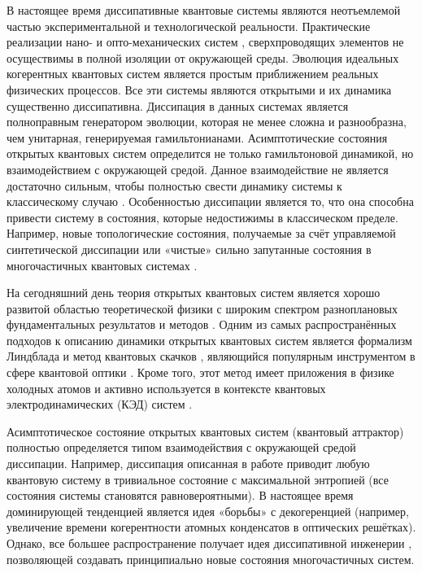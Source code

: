 
{\actuality} 
В настоящее время диссипативные квантовые системы являются неотъемлемой частью экспериментальной и технологической реальности.
Практические реализации нано- \autocite{Poot2012} и опто-механических систем \autocite{Aspelmeyer2014}, сверхпроводящих элементов \autocite{Clarke2008} не осуществимы в полной изоляции от окружающей среды.
Эволюция идеальных когерентных квантовых систем является простым приближением реальных физических процессов. 
Все эти системы являются открытыми и их динамика существенно диссипативна.
Диссипация в данных системах является полноправным генератором эволюции, которая не менее сложна и разнообразна, чем унитарная, генерируемая гамильтонианами.
Асимптотические состояния открытых квантовых систем определится не только гамильтоновой динамикой, но взаимодействием с окружающей средой.
Данное взаимодействие не является достаточно сильным, чтобы полностью свести динамику системы к классическому случаю \autocite{Breuer2007}.
Особенностью диссипации является то, что она способна привести систему в состояния, которые недостижимы в классическом пределе.
Например, новые топологические состояния, получаемые за счёт управляемой синтетической диссипации \autocite{Diehl2011} или «чистые» сильно запутанные состояния в многочастичных квантовых системах \autocite{Kraus2008}.

На сегодняшний день теория открытых квантовых систем является хорошо развитой областью теоретической физики с широким спектром разноплановых фундаментальных результатов и методов \autocite{Breuer2007}.
Одним из самых распространённых подходов к описанию динамики открытых квантовых систем является формализм Линдблада \autocite{Lindblad1976, Gorini1976} и метод квантовых скачков \autocite{Dalibard1992, Dum1992, Plenio1998}, являющийся популярным инструментом в сфере квантовой оптики \autocite{Carmichael1993}.
Кроме того, этот метод имеет приложения в физике холодных атомов \autocite{Diehl2011, Diehl2008, Marcuzzi2014} и активно используется в контексте квантовых электродинамических (КЭД) систем \autocite{Imamoglu1999, Walther2006, Arakawa2015}.

Асимптотическое состояние открытых квантовых систем (квантовый аттрактор) полностью определяется типом взаимодействия с окружающей средой диссипации. 
Например, диссипация описанная в работе \autocite{Poletti2013} приводит любую квантовую систему в тривиальное состояние с максимальной энтропией (все состояния системы становятся равновероятными).
В настоящее время доминирующей тенденцией является идея «борьбы» с декогеренцией (например, увеличение времени когерентности атомных конденсатов в оптических решётках). Однако, все большее распространение получает идея диссипативной инженерии \autocite{Diehl2008}, позволяющей создавать принципиально новые состояния многочастичных систем.

